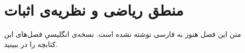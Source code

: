 \chapter{منطق ریاضی و نظریه‌ی اثبات}
\label{ch:01-mathematical-logic-and-proof-theory-fa-01}

متن این فصل هنوز به فارسی نوشته نشده است. نسخه‌ی انگلیسیِ فصل‌های این کتابچه را در  ببینید.
